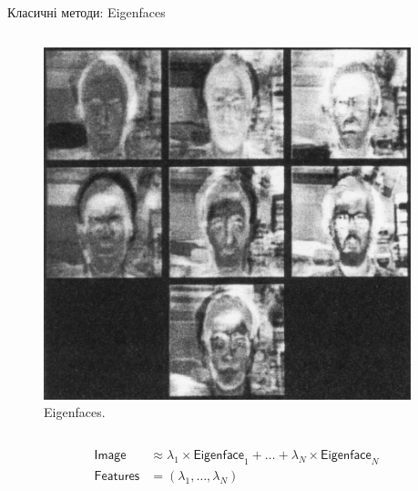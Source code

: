 \documentclass{zkdl-presentation-template}
\begin{document}
\begin{frame}{Класичні методи: Eigenfaces}
\begin{columns}
            \begin{column}{0.5\textwidth}
                \begin{figure}
                \centering
                    \includegraphics[width=0.95\textwidth]{images/eigenfaces.png}
                    \caption{Eigenfaces.}
                \end{figure}
            \end{column}
        \end{columns}

        \vspace{-20px}
        \begin{align*}
            \mathsf{Image} &\approx \lambda_1 \times \mathsf{Eigenface}_1 + \dots + \lambda_N \times \mathsf{Eigenface}_N \\
            \mathsf{Features} &= (\lambda_1,\dots,\lambda_N)
        \end{align*}
    \end{frame}
\end{document}
